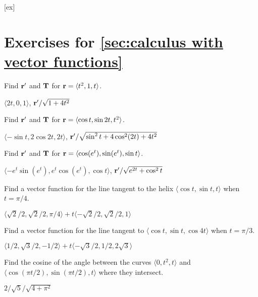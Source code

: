 [ex]
\section*{Exercises for \ref{sec:calculus with vector functions}}

\begin{enumialphparenastyle}

\begin{ex}
Find ${\bf r}'$ and $\bf T$ for
${\bf r} = \langle t^2,1,t\rangle$.
\begin{sol}
	$\langle 2t,0,1\rangle$, ${\bf r}'/\sqrt{1+4t^2}$
\end{sol}
\end{ex}

\begin{ex}
Find ${\bf r}'$ and $\bf T$ for
${\bf r} = \langle \cos t, \sin 2t, t^2\rangle$.
\begin{sol}
	$\langle -\sin t, 2\cos 2t,2t\rangle$,
	${\bf r}'/\sqrt{\sin^2t + 4\cos^2(2t)+4t^2}$
\end{sol}
\end{ex}

\begin{ex}
Find ${\bf r}'$ and $\bf T$ for
${\bf r} = \langle \cos(e^t),\sin(e^t),\sin t\rangle$.
\begin{sol} $\langle -e^t\sin(e^t),e^t\cos(e^t),\cos t\rangle$,
${\bf r}'/\sqrt{e^{2t}+\cos^2 t}$
\end{sol}
\end{ex}

\begin{ex}
Find a vector function for the line tangent to the helix
$\langle \cos t,\sin t, t\rangle$ when $t=\pi/4$.
\begin{sol} $\langle \sqrt2/2,\sqrt2/2,\pi/4\rangle+
t\langle -\sqrt2/2,\sqrt2/2,1\rangle$
\end{sol}
\end{ex}

\begin{ex}
Find a vector function for the line tangent to 
$\langle \cos t,\sin t, \cos 4t \rangle$ when $t=\pi/3$.
\begin{sol} $\langle 1/2,\sqrt3/2,-1/2\rangle+
t\langle -\sqrt3/2,1/2,2\sqrt3\rangle$
\end{sol}
\end{ex}

\begin{ex}
Find the cosine of the angle between the curves $\langle
0,t^2,t\rangle$ and $\langle \cos(\pi t/2),\sin(\pi t/2), t\rangle$
where they intersect.
\begin{sol} $2/\sqrt5/\sqrt{4+\pi^2}$
\end{sol}
\end{ex}


\end{enumialphparenastyle}
